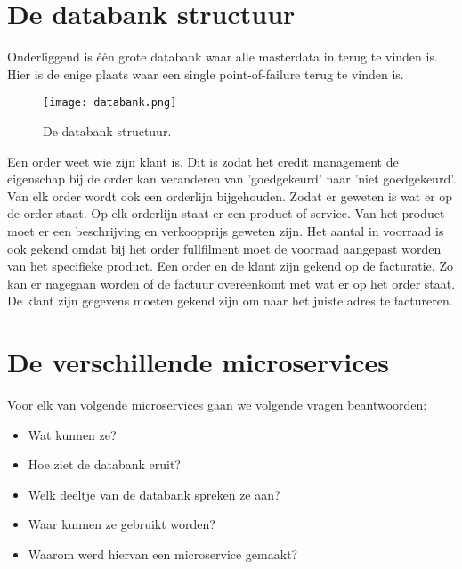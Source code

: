 \section{De databank structuur}
Onderliggend is één grote databank waar alle masterdata in terug te vinden is. Hier is de enige plaats waar een single point-of-failure terug te vinden is. 
\begin{figure}[h]
	\texttt{[image: databank.png]}
	\caption{De databank structuur.}
	\centering
\end{figure}

Een order weet wie zijn klant is. Dit is zodat het credit management de eigenschap bij de order kan veranderen van 'goedgekeurd' naar 'niet goedgekeurd'. Van elk order wordt ook een orderlijn bijgehouden. Zodat er geweten is wat er op de order staat. Op elk orderlijn staat er een product of service. Van het product moet er een beschrijving en verkoopprijs geweten zijn. Het aantal in voorraad is ook gekend omdat bij het order fullfilment moet de voorraad aangepast worden van het specifieke product. Een order en de klant zijn gekend op de facturatie. Zo kan er nagegaan worden of de factuur overeenkomt met wat er op het order staat. De klant zijn gegevens moeten gekend zijn om naar het juiste adres te factureren.


\section{De verschillende microservices}
Voor elk van volgende microservices gaan we volgende vragen beantwoorden:
\begin{itemize}
	\item Wat kunnen ze?
	\item Hoe ziet de databank eruit?
	\item Welk deeltje van de databank spreken ze aan?
	\item Waar kunnen ze gebruikt worden?
	\item Waarom werd hiervan een microservice gemaakt?
\end{itemize}

